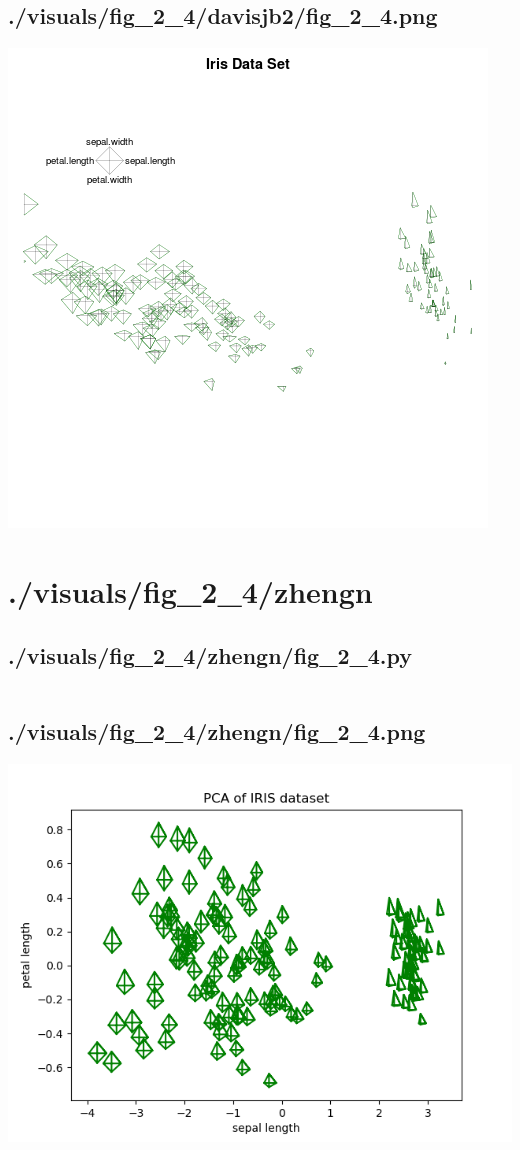\documentclass{report}
\begin{document}
    \subsection{./visuals/fig\_2\_4/davisjb2/fig\_2\_4.png}
    \includegraphics[width=\textwidth]{.././visuals/fig_2_4/davisjb2/fig_2_4.png}
    \pagebreak
    \section{./visuals/fig\_2\_4/zhengn}
    \subsection{./visuals/fig\_2\_4/zhengn/fig\_2\_4.py}
    \inputminted[breaklines=true]{python}{.././visuals/fig_2_4/zhengn/fig_2_4.py}
    \subsection{./visuals/fig\_2\_4/zhengn/fig\_2\_4.png}
    \includegraphics[width=\textwidth]{.././visuals/fig_2_4/zhengn/fig_2_4.png}
    \pagebreak
\end{document}
